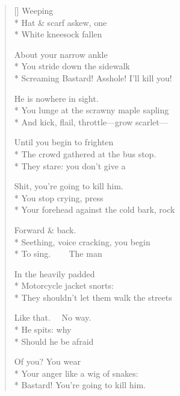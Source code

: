 \label{ch:medusa}
\settowidth{\versewidth}{And kick, flail, throttle---grow scarlet---}
\begin{verse}[\versewidth]
Weeping\\*
Hat \& scarf askew, one\\*
White kneesock fallen

About your narrow ankle\\*
You stride down the sidewalk\\*
Screaming Bastard! Asshole! I'll kill you!

He is nowhere in sight.\\*
You lunge at the scrawny maple sapling\\*
And kick, flail, throttle---grow scarlet---

Until you begin to frighten\\*
The crowd gathered at the bus stop.\\*
They stare: you don't give a

Shit, you're going to kill him.\\*
You stop crying, press\\*
Your forehead against the cold bark, rock

Forward \& back.\\*
Seething, voice cracking, you begin\\*
To sing.     The man

In the heavily padded\\*
Motorcycle jacket snorts:\\*
They shouldn't let them walk the streets

Like that.   No way.\\*
He spits: why\\*
Should he be afraid

Of you? You wear\\*
Your anger like a wig of snakes:\\*
Bastard! You're going to kill him.
\end{verse}
